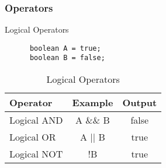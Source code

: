 \documentclass[10pt, compress]{beamer}
\begin{document}
\begin{frame}[fragile]
  \frametitle{Operators}
  \begin{block}{Logical Operators}
    \begin{verbatim}
      boolean A = true;
      boolean B = false;
    \end{verbatim}
    \begin{table}
      \begin{tabular}{lcc}
        \toprule
        Operator & Example & Output\\
        \midrule
        Logical AND & A \&\& B & false\\
        Logical OR & A || B & true\\
        Logical NOT & !B & true\\
        \bottomrule
      \end{tabular}
      \caption{Logical Operators}
    \end{table}
  \end{block}
\end{frame}

\end{document}
